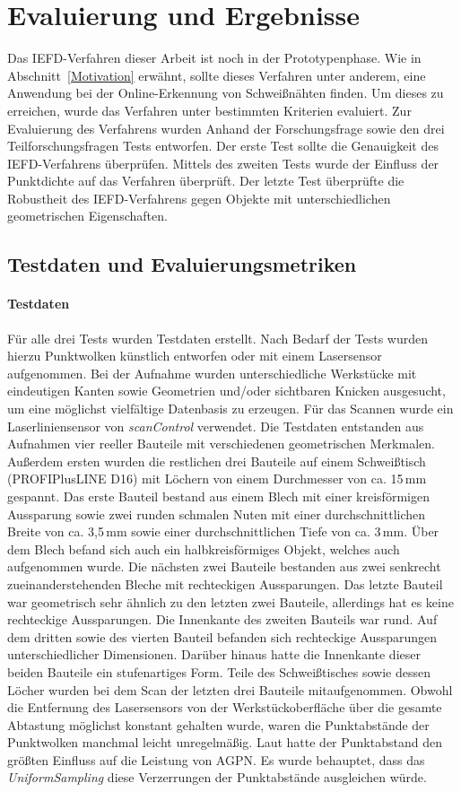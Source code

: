\chapter{Evaluierung und Ergebnisse}
Das IEFD-Verfahren dieser Arbeit ist noch in der Prototypenphase. Wie in Abschnitt~\ref{Motivation} erwähnt, sollte dieses Verfahren unter anderem, eine Anwendung bei der Online-Erkennung von Schweißnähten finden. Um dieses zu erreichen, wurde das Verfahren unter bestimmten Kriterien evaluiert. Zur Evaluierung des Verfahrens wurden Anhand der Forschungsfrage sowie den drei Teilforschungsfragen Tests entworfen. Der erste Test sollte die Genauigkeit des IEFD-Verfahrens überprüfen. Mittels des zweiten Tests wurde der Einfluss der Punktdichte auf das Verfahren überprüft. Der letzte Test überprüfte die Robustheit des IEFD-Verfahrens gegen Objekte mit unterschiedlichen geometrischen Eigenschaften.

\section{Testdaten und Evaluierungsmetriken}
\subsubsection{Testdaten}\label{test_data}
Für alle drei Tests wurden Testdaten erstellt. Nach Bedarf der Tests wurden hierzu Punktwolken künstlich entworfen oder mit einem Lasersensor aufgenommen. Bei der Aufnahme wurden unterschiedliche Werkstücke mit eindeutigen Kanten sowie Geometrien und/oder sichtbaren Knicken ausgesucht, um eine möglichst vielfältige Datenbasis zu erzeugen. Für das Scannen wurde ein Laserliniensensor von \textit{scanControl} verwendet. Die Testdaten entstanden aus Aufnahmen vier reeller Bauteile mit verschiedenen geometrischen Merkmalen. Außerdem ersten wurden die restlichen drei Bauteile auf einem Schweißtisch (PROFIPlusLINE D16) mit Löchern von einem Durchmesser von ca. 15\,mm gespannt. Das erste Bauteil bestand aus einem Blech mit einer kreisförmigen Aussparung sowie zwei runden schmalen Nuten mit einer durchschnittlichen Breite von ca. 3,5\,mm sowie einer durchschnittlichen Tiefe von ca. 3\,mm. Über dem Blech befand sich auch ein halbkreisförmiges Objekt, welches auch aufgenommen wurde. Die nächsten zwei Bauteile bestanden aus zwei senkrecht zueinanderstehenden Bleche mit rechteckigen Aussparungen. Das letzte Bauteil war geometrisch sehr ähnlich zu den letzten zwei Bauteile, allerdings hat es keine rechteckige Aussparungen. Die Innenkante des zweiten Bauteils war rund. Auf dem dritten sowie des vierten Bauteil befanden sich rechteckige Aussparungen unterschiedlicher Dimensionen. Darüber hinaus hatte die Innenkante dieser beiden Bauteile ein stufenartiges Form. Teile des Schweißtisches sowie dessen Löcher wurden bei dem Scan der letzten drei Bauteile mitaufgenommen. Obwohl die Entfernung des Lasersensors von der Werkstückoberfläche über die gesamte Abtastung möglichst konstant gehalten wurde, waren die Punktabstände der Punktwolken manchmal leicht unregelmäßig. Laut \textcite[9]{ni_edge_2016} hatte der Punktabstand den größten Einfluss auf die Leistung von AGPN. Es wurde behauptet, dass das \textit{UniformSampling} diese Verzerrungen der Punktabstände ausgleichen würde. 

